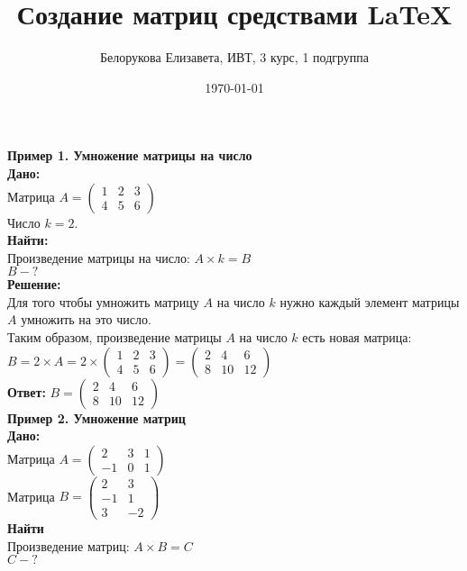 \documentclass[a4paper,12pt]{article} %
\author{Белорукова Елизавета, ИВТ, 3 курс, 1 подгруппа}
\title{Создание матриц средствами LaTeX}
\date{\today}
\begin{document}
\maketitle
\newpage
\large
\noindent \textbf{Пример 1. Умножение матрицы на число}\\
\normalsize \textbf{Дано:}\\
Матрица $A=\begin{pmatrix}
1&2&3\\
4&5&6
\end{pmatrix}$ \\
Число $k=2$.\\
\textbf{Найти:}\\
Произведение матрицы на число: $A \times k = B$\\
$B - ?$\\
\textbf{Решение:}\\
Для того чтобы умножить матрицу $A$ на число $k$ нужно каждый элемент матрицы $A$ умножить на это число.\\
Таким образом, произведение матрицы $A$ на число $k$ есть новая матрица:\\
$B=2 \times A=2 \times \begin{pmatrix}
1&2&3\\
4&5&6\end{pmatrix}=\begin{pmatrix}
2&4&6\\
8&10&12\end{pmatrix}$\\
\textbf{Ответ:} $B=\begin{pmatrix}
2&4&6\\
8&10&12\end{pmatrix}$\\[2cm]
\large \textbf{Пример 2. Умножение матриц}\\
\normalsize \textbf{Дано:}\\
Матрица $A=\begin{pmatrix}
2&3&1\\
-1&0&1\end{pmatrix}$\\
Матрица $B=\begin{pmatrix}
2&3\\
-1&1\\
3&-2\end{pmatrix}$\\
\textbf{Найти}\\
Произведение матриц: $A \times B=C$\\
$C - ?$\\
\end{document}
